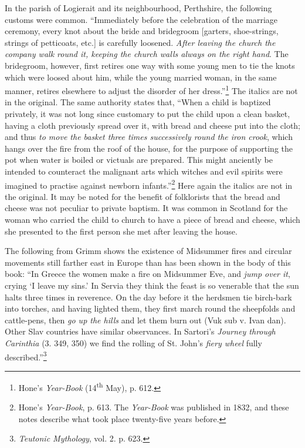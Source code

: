 \documentclass[a4paper, 11pt, oneside, polutonikogreek, english]{article}
\begin{document}
In the parish of Logierait and its neighbourhood, Perthshire, the following customs were common. ``Immediately before the celebration of the marriage ceremony, every knot about the bride and bridegroom [garters, shoe-strings, strings of petticoats, etc.] is carefully loosened. \emph{After leaving the church the company walk round it, keeping the church walls always on the right hand}. The bridegroom, however, first retires one way with some young men to tie the knots which were loosed about him, while the young married woman, in the same manner, retires elsewhere to adjust the disorder of her dress.''\footnote{Hone's \emph{Year-Book} (14\textsuperscript{th} May), p. 612.} The italics are not in the original. The same authority states that, ``When a child is baptized privately, it was not long since customary to put the child upon a clean basket, having a cloth previously spread over it, with bread and cheese put into the cloth; and thus \emph{to move the basket three times successively round the iron crook}, which hangs over the fire from the roof of the house, for the purpose of supporting the pot when water is boiled or victuals are prepared. This might anciently be intended to counteract the malignant arts which witches and evil spirits were imagined to practise against newborn infants.''\footnote{Hone's \emph{Year-Book}, p. 613. The \emph{Year-Book} was published in 1832, and these notes describe what took place twenty-five years before.} Here again the italics are not in the original. It may be noted for the benefit of folklorists that the bread and cheese was not peculiar to private baptism. It was common in Scotland for the woman who carried the child to church to have a piece of bread and cheese, which she presented to the first person she met after leaving the house.

The following from Grimm shows the existence of Midsummer fires and circular movements still farther east in Europe than has been shown in the body of this book: ``In Greece the women make a fire on Midsummer Eve, and \emph{jump over it}, crying `I leave my sins.' In Servia they think the feast is so venerable that the sun halts three times in reverence. On the day before it the herdsmen tie birch-bark into torches, and having lighted them, they first march round the sheepfolds and cattle-pens, then \emph{go up the hills} and let them burn out (Vuk sub v. Ivan dan). Other Slav countries have similar observances. In Sartori's \emph{Journey through Carinthia} (3. 349, 350) we find the rolling of St. John's \emph{fiery wheel} fully described.''\footnote{\emph{Teutonic Mythology}, vol. 2. p. 623.}
\end{document}
